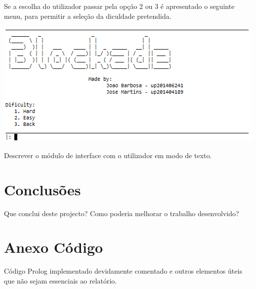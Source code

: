 \documentclass[a4paper]{article}
\begin{document}
Se a escolha do utilizador passar pela opção 2 ou 3 é apresentado o seguinte menu, para permitir a seleção da diculdade pretendida.

\begin{center}
\includegraphics[scale = 0.7]{fig6.png}
\end{center}








Descrever o módulo de interface com o utilizador em modo de texto.


\section{Conclusões}
Que conclui deste projecto? Como poderia melhorar o trabalho desenvolvido?


\clearpage
{}
\renewcommand\refname{Bibliografia}



\newpage
\appendix
\section{Anexo Código}
Código Prolog implementado devidamente comentado e outros elementos úteis que não sejam essenciais ao relatório.
\end{document}
